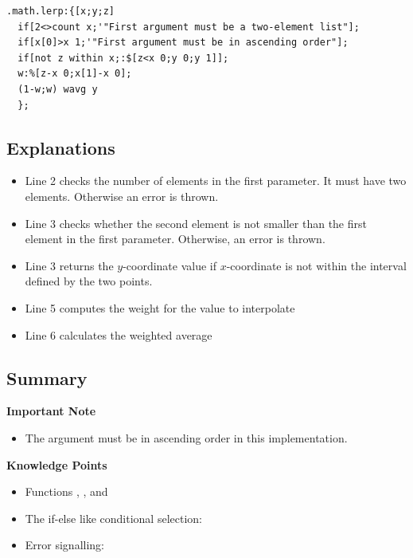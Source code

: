 \begin{verbatim}
.math.lerp:{[x;y;z]
  if[2<>count x;'"First argument must be a two-element list"];
  if[x[0]>x 1;'"First argument must be in ascending order"];
  if[not z within x;:$[z<x 0;y 0;y 1]];
  w:%[z-x 0;x[1]-x 0];
  (1-w;w) wavg y
  };
\end{verbatim}

\subsection{Explanations}

\begin{itemize}
\item Line 2 checks the number of elements in the first parameter. It must have two elements. Otherwise an error is thrown.
\item Line 3 checks whether the second element is not smaller than the first element in the first parameter. Otherwise, an error is thrown.
\item Line 3 returns the $y$-coordinate value if $x$-coordinate is not within the interval defined by the two points.
\item Line 5 computes the weight for the value to interpolate
\item Line 6 calculates the weighted average
\end{itemize}


\subsection{Summary}

\begin{importantblock}
\textbf{Important Note}
\begin{itemize}
\item The argument  must be in ascending order in this implementation.
\end{itemize}
\end{importantblock}

\begin{noteblock}
\textbf{Knowledge Points}
\begin{itemize}
\item Functions \href{https://code.kx.com/q/ref/if/}{}, \href{https://code.kx.com/q/ref/count/}{}, \href{https://code.kx.com/q/ref/within/}{} and \href{https://code.kx.com/q/ref/wavg/}{} 
\item The if-else like conditional selection: \href{https://code.kx.com/q/ref/cond/}{\q{$}}
\item Error signalling: \href{https://code.kx.com/q/ref/signal/}{}
\end{itemize}
\end{noteblock}

\clearpage

